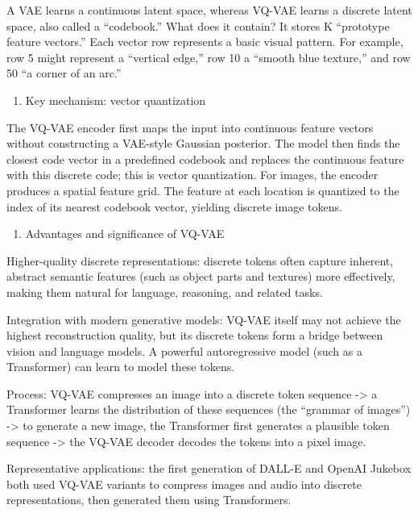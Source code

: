 A VAE learns a continuous latent space, whereas VQ-VAE learns a discrete latent space, also called a ``codebook.'' What does it contain? It stores K ``prototype feature vectors.'' Each vector row represents a basic visual pattern. For example, row 5 might represent a ``vertical edge,'' row 10 a ``smooth blue texture,'' and row 50 ``a corner of an arc.''

\begin{enumerate}
\def\labelenumi{\arabic{enumi}.}
\setcounter{enumi}{1}
\tightlist
\item
  Key mechanism: vector quantization
\end{enumerate}

The VQ-VAE encoder first maps the input into continuous feature vectors without constructing a VAE-style Gaussian posterior. The model then finds the closest code vector in a predefined codebook and replaces the continuous feature with this discrete code; this is vector quantization. For images, the encoder produces a spatial feature grid. The feature at each location is quantized to the index of its nearest codebook vector, yielding discrete image tokens.

\begin{enumerate}
\def\labelenumi{\arabic{enumi}.}
\setcounter{enumi}{2}
\tightlist
\item
  Advantages and significance of VQ-VAE
\end{enumerate}

Higher-quality discrete representations: discrete tokens often capture inherent, abstract semantic features (such as object parts and textures) more effectively, making them natural for language, reasoning, and related tasks.

Integration with modern generative models: VQ-VAE itself may not achieve the highest reconstruction quality, but its discrete tokens form a bridge between vision and language models. A powerful autoregressive model (such as a Transformer) can learn to model these tokens.

Process: VQ-VAE compresses an image into a discrete token sequence -\textgreater{} a Transformer learns the distribution of these sequences (the ``grammar of images'') -\textgreater{} to generate a new image, the Transformer first generates a plausible token sequence -\textgreater{} the VQ-VAE decoder decodes the tokens into a pixel image.

Representative applications: the first generation of DALL-E and OpenAI Jukebox both used VQ-VAE variants to compress images and audio into discrete representations, then generated them using Transformers.

